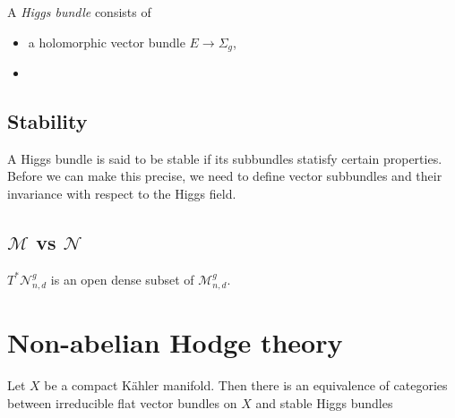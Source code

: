 \documentclass{article}
\begin{document}
\begin{definition}
  A \emph{Higgs bundle} consists of
  \begin{itemize}
    \item a holomorphic vector bundle $E\to\Sigma_g$,
    \item
  \end{itemize}
\end{definition}

\subsection{Stability}

A Higgs bundle is said to be stable if its subbundles statisfy certain
properties. Before we can make this precise, we need to define
vector subbundles and their invariance with respect to the Higgs field.

\subsection{$\mathcal M$ vs $\mathcal N$}

\begin{proposition}
  $T^*\mathcal N^g_{n,d}$ is an open dense subset of $\mathcal M^g_{n,d}$.
\end{proposition}

\section{Non-abelian Hodge theory}

\begin{theorem}
  Let $X$ be a compact K\"ahler manifold. Then there is an equivalence
  of categories between irreducible flat vector bundles on $X$
  and stable Higgs bundles
\end{theorem}

\printbibliography
\end{document}
